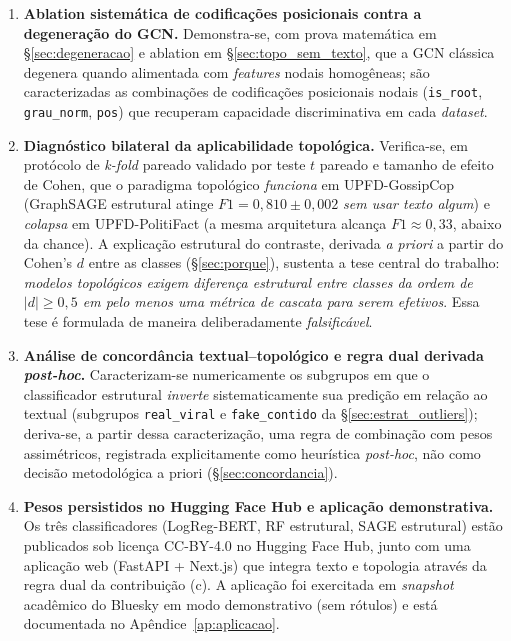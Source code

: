 \begin{enumerate}[label=(\alph*)]
\item \textbf{Ablation sistem\'atica de codifica\c{c}\~oes posicionais
  contra a degenera\c{c}\~ao do GCN.} Demonstra-se, com prova
  matem\'atica em \S\ref{sec:degeneracao} e ablation em
  \S\ref{sec:topo_sem_texto}, que a GCN cl\'assica
  \cite{kipf2017gcn} degenera quando alimentada com \emph{features}
  nodais homog\^eneas; s\~ao caracterizadas as combina\c{c}\~oes de
  codifica\c{c}\~oes posicionais nodais (\texttt{is\_root},
  \texttt{grau\_norm}, \texttt{pos}) que recuperam capacidade discriminativa
  em cada \emph{dataset}.

\item \textbf{Diagn\'ostico bilateral da aplicabilidade topol\'ogica.}
  Verifica-se, em prot\'ocolo de \emph{k-fold} pareado validado por teste
  $t$ pareado e tamanho de efeito de Cohen, que o paradigma topol\'ogico
  \emph{funciona} em UPFD-GossipCop (GraphSAGE estrutural atinge
  $F1 = 0{,}810 \pm 0{,}002$ \emph{sem usar texto algum}) e
  \emph{colapsa} em UPFD-PolitiFact (a mesma arquitetura alcan\c{c}a
  $F1 \approx 0{,}33$, abaixo da chance). A explica\c{c}\~ao estrutural
  do contraste, derivada \emph{a priori} a partir do Cohen's $d$ entre
  as classes (\S\ref{sec:porque}), sustenta a tese central do trabalho:
  \emph{modelos topol\'ogicos exigem diferen\c{c}a estrutural entre
  classes da ordem de $|d| \geq 0{,}5$ em pelo menos uma m\'etrica de
  cascata para serem efetivos}. Essa tese \'e formulada de maneira deliberadamente
  \emph{falsific\'avel}.

\item \textbf{An\'alise de concord\^ancia textual--topol\'ogico e regra
  dual derivada \emph{post-hoc}.} Caracterizam-se numericamente os
  subgrupos em que o classificador estrutural \emph{inverte}
  sistematicamente sua predi\c{c}\~ao em rela\c{c}\~ao ao textual
  (subgrupos \texttt{real\_viral} e \texttt{fake\_contido} da
  \S\ref{sec:estrat_outliers}); deriva-se, a partir dessa
  caracteriza\c{c}\~ao, uma regra de combina\c{c}\~ao com pesos
  assim\'etricos, registrada explicitamente como heur\'istica
  \emph{post-hoc}, n\~ao como decis\~ao metodol\'ogica a priori
  (\S\ref{sec:concordancia}).

\item \textbf{Pesos persistidos no Hugging Face Hub e aplica\c{c}\~ao
  demonstrativa.} Os tr\^es classificadores (LogReg-BERT, RF estrutural,
  SAGE estrutural) est\~ao publicados sob licen\c{c}a CC-BY-4.0 no
  Hugging Face Hub, junto com uma aplica\c{c}\~ao web
  (FastAPI + Next.js) que integra texto e topologia atrav\'es da regra
  dual da contribui\c{c}\~ao (c). A aplica\c{c}\~ao foi exercitada em
  \emph{snapshot} acad\^emico do Bluesky em modo demonstrativo
  (sem r\'otulos) e est\'a documentada no Ap\^endice~\ref{ap:aplicacao}.
\end{enumerate}

